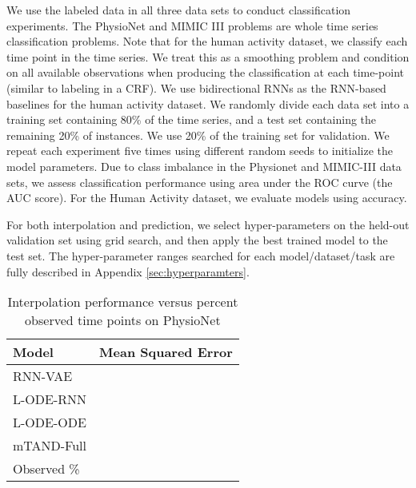 We use the labeled data in all three data sets to conduct classification experiments. The PhysioNet and MIMIC III problems are whole time series classification problems. Note that for the human activity dataset, we classify each time point in the time series. We treat this as a smoothing problem and condition on all available observations when producing the classification at each time-point (similar to labeling in a CRF). We use bidirectional RNNs as the RNN-based baselines for the human activity dataset. We randomly divide each data set into a training set containing 80\% of the time series,  and a test set containing the remaining 20\% of instances. We use 20\% of the training set for validation. We repeat each experiment five times using different random seeds to initialize the model parameters. Due to class imbalance in the Physionet and MIMIC-III data sets, we assess classification performance using area under the ROC curve (the AUC score). For the Human Activity dataset, we evaluate models using accuracy. 

For both interpolation and prediction, we select hyper-parameters on the held-out validation set using grid search, and then apply the best trained model to the test set. The hyper-parameter ranges searched for each model/dataset/task are fully described in Appendix \ref{sec:hyperparamters}.





\begin{table}[t]
\centering
\scriptsize
\caption{Interpolation performance versus percent observed time points on PhysioNet}
\label{table:phy_interp}
\begin{tabular}[h]{l c c c c c}
     \toprule
     {\bf Model} & \multicolumn{5}{c}{{\bf Mean Squared Error} } \\
     \midrule
     RNN-VAE &   &  &  &  & \\
     L-ODE-RNN &  &  &  &  &  \\
     L-ODE-ODE &   &  &  &  & \\
     mTAND-Full &  &  &  &   &  \\
     \midrule
     Observed \%  &  &  &  &  &  \\ 
    \bottomrule
\end{tabular}
\end{table}

